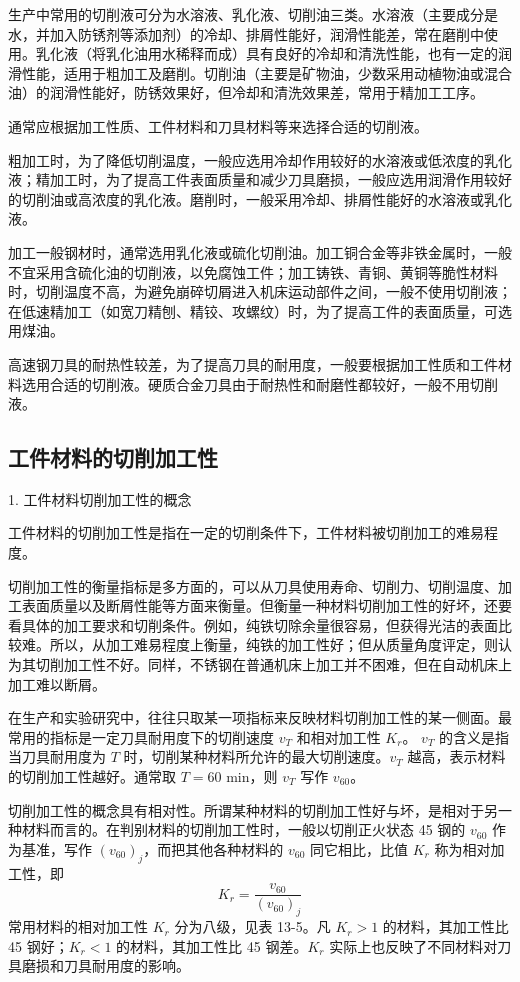 \documentclass[UTF8]{ctexbook}
\newcommand{\◎}{\ensuremath{\bigcirc}}
\begin{document}
生产中常用的切削液可分为水溶液、乳化液、切削油三类。水溶液（主要成分是水，并加入防锈剂等添加剂）的冷却、排屑性能好，润滑性能差，常在磨削中使用。乳化液（将乳化油用水稀释而成）具有良好的冷却和清洗性能，也有一定的润滑性能，适用于粗加工及磨削。切削油（主要是矿物油，少数采用动植物油或混合油）的润滑性能好，防锈效果好，但冷却和清洗效果差，常用于精加工工序。

通常应根据加工性质、工件材料和刀具材料等来选择合适的切削液。

粗加工时，为了降低切削温度，一般应选用冷却作用较好的水溶液或低浓度的乳化液；精加工时，为了提高工件表面质量和减少刀具磨损，一般应选用润滑作用较好的切削油或高浓度的乳化液。磨削时，一般采用冷却、排屑性能好的水溶液或乳化液。

加工一般钢材时，通常选用乳化液或硫化切削油。加工铜合金等非铁金属时，一般不宜采用含硫化油的切削液，以免腐蚀工件；加工铸铁、青铜、黄铜等脆性材料时，切削温度不高，为避免崩碎切屑进入机床运动部件之间，一般不使用切削液；在低速精加工（如宽刀精刨、精铰、攻螺纹）时，为了提高工件的表面质量，可选用煤油。

高速钢刀具的耐热性较差，为了提高刀具的耐用度，一般要根据加工性质和工件材料选用合适的切削液。硬质合金刀具由于耐热性和耐磨性都较好，一般不用切削液。

\subsection{工件材料的切削加工性}
1. 工件材料切削加工性的概念

工件材料的切削加工性是指在一定的切削条件下，工件材料被切削加工的难易程度。

切削加工性的衡量指标是多方面的，可以从刀具使用寿命、切削力、切削温度、加工表面质量以及断屑性能等方面来衡量。但衡量一种材料切削加工性的好坏，还要看具体的加工要求和切削条件。例如，纯铁切除余量很容易，但获得光洁的表面比较难。所以，从加工难易程度上衡量，纯铁的加工性好；但从质量角度评定，则认为其切削加工性不好。同样，不锈钢在普通机床上加工并不困难，但在自动机床上加工难以断屑。

在生产和实验研究中，往往只取某一项指标来反映材料切削加工性的某一侧面。最常用的指标是一定刀具耐用度下的切削速度 $v_T$ 和相对加工性 $K_r$。
$v_T$ 的含义是指当刀具耐用度为 $T$ 时，切削某种材料所允许的最大切削速度。$v_T$ 越高，表示材料的切削加工性越好。通常取 $T=60$ min，则 $v_T$ 写作 $v_{60}$。

切削加工性的概念具有相对性。所谓某种材料的切削加工性好与坏，是相对于另一种材料而言的。在判别材料的切削加工性时，一般以切削正火状态 45 钢的 $v_{60}$ 作为基准，写作 $(v_{60})_j$，而把其他各种材料的 $v_{60}$ 同它相比，比值 $K_r$ 称为相对加工性，即
$$K_r = \frac{v_{60}}{(v_{60})_j}$$
常用材料的相对加工性 $K_r$ 分为八级，见表 13-5。凡 $K_r > 1$ 的材料，其加工性比 45 钢好；$K_r < 1$ 的材料，其加工性比 45 钢差。$K_r$ 实际上也反映了不同材料对刀具磨损和刀具耐用度的影响。
\end{document}
